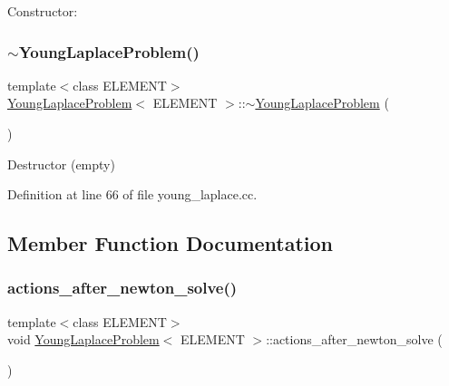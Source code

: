 Constructor\+: 

\mbox{\label{classYoungLaplaceProblem_aa3482606bfd86a3db9d2dec86ba75f14}} 
\subsubsection{\texorpdfstring{$\sim$\+Young\+Laplace\+Problem()}{~YoungLaplaceProblem()}\hspace{0.1cm}{\footnotesize\ttfamily [2/2]}}
{\footnotesize\ttfamily template$<$class E\+L\+E\+M\+E\+NT$>$ \\
\hyperlink{classYoungLaplaceProblem}{Young\+Laplace\+Problem}$<$ E\+L\+E\+M\+E\+NT $>$\+::$\sim$\hyperlink{classYoungLaplaceProblem}{Young\+Laplace\+Problem} (\begin{DoxyParamCaption}{ }\end{DoxyParamCaption})\hspace{0.3cm}{\ttfamily [inline]}}



Destructor (empty) 



Definition at line 66 of file young\+\_\+laplace.\+cc.



\subsection{Member Function Documentation}
\mbox{\label{classYoungLaplaceProblem_a8eed49ad1c6247cc293a584ab9262efc}} 
\subsubsection{\texorpdfstring{actions\+\_\+after\+\_\+newton\+\_\+solve()}{actions\_after\_newton\_solve()}\hspace{0.1cm}{\footnotesize\ttfamily [1/2]}}
{\footnotesize\ttfamily template$<$class E\+L\+E\+M\+E\+NT$>$ \\
void \hyperlink{classYoungLaplaceProblem}{Young\+Laplace\+Problem}$<$ E\+L\+E\+M\+E\+NT $>$\+::actions\+\_\+after\+\_\+newton\+\_\+solve (\begin{DoxyParamCaption}{ }\end{DoxyParamCaption})\hspace{0.3cm}{\ttfamily [inline]}}



